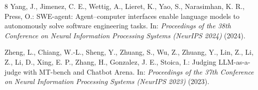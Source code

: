 \documentclass[pdflatex,sn-mathphys-num]{sn-jnl}
\theoremstyle{thmstyleone}
\theoremstyle{thmstyletwo}
\theoremstyle{thmstylethree}
\begin{document}
\begin{thebibliography}{8}
Yang, J., Jimenez, C. E., Wettig, A., Lieret, K., Yao, S., Narasimhan, K. R., Press, O.: SWE-agent: Agent--computer interfaces enable language models to autonomously solve software engineering tasks. In: \textit{Proceedings of the 38th Conference on Neural Information Processing Systems (NeurIPS 2024)} (2024).

Zheng, L., Chiang, W.-L., Sheng, Y., Zhuang, S., Wu, Z., Zhuang, Y., Lin, Z., Li, Z., Li, D., Xing, E. P., Zhang, H., Gonzalez, J. E., Stoica, I.: Judging LLM-as-a-judge with MT-bench and Chatbot Arena. In: \textit{Proceedings of the 37th Conference on Neural Information Processing Systems (NeurIPS 2023)} (2023).

\end{thebibliography}

\end{document}
